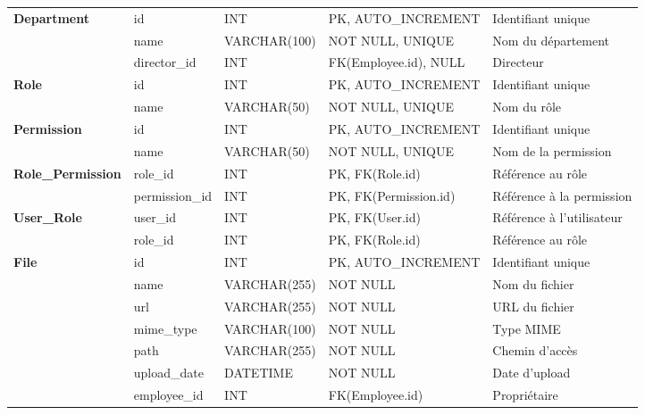 \begin{longtable}{|p{2.5cm}|p{3cm}|p{3cm}|p{3cm}|p{3cm}|}
    \multirow{3}{*}{\textbf{Department}} & id & INT & PK, AUTO\_INCREMENT & Identifiant unique \\
    \cline{2-5}
    & name & VARCHAR(100) & NOT NULL, UNIQUE & Nom du département \\
    \cline{2-5}
    & director\_id & INT & FK(Employee.id), NULL & Directeur \\
    \hline

    \multirow{2}{*}{\textbf{Role}} & id & INT & PK, AUTO\_INCREMENT & Identifiant unique \\
    \cline{2-5}
    & name & VARCHAR(50) & NOT NULL, UNIQUE & Nom du rôle \\
    \hline

    \multirow{2}{*}{\textbf{Permission}} & id & INT & PK, AUTO\_INCREMENT & Identifiant unique \\
    \cline{2-5}
    & name & VARCHAR(50) & NOT NULL, UNIQUE & Nom de la permission \\
    \hline

    \multirow{2}{*}{\textbf{Role\_Permission}} & role\_id & INT & PK, FK(Role.id) & Référence au rôle \\
    \cline{2-5}
    & permission\_id & INT & PK, FK(Permission.id) & Référence à la permission \\
    \hline

    \multirow{2}{*}{\textbf{User\_Role}} & user\_id & INT & PK, FK(User.id) & Référence à l'utilisateur \\
    \cline{2-5}
    & role\_id & INT & PK, FK(Role.id) & Référence au rôle \\
    \hline

    \multirow{6}{*}{\textbf{File}} & id & INT & PK, AUTO\_INCREMENT & Identifiant unique \\
    \cline{2-5}
    & name & VARCHAR(255) & NOT NULL & Nom du fichier \\
    \cline{2-5}
    & url & VARCHAR(255) & NOT NULL & URL du fichier \\
    \cline{2-5}
    & mime\_type & VARCHAR(100) & NOT NULL & Type MIME \\
    \cline{2-5}
    & path & VARCHAR(255) & NOT NULL & Chemin d'accès \\
    \cline{2-5}
    & upload\_date & DATETIME & NOT NULL & Date d'upload \\
    \cline{2-5}
    & employee\_id & INT & FK(Employee.id) & Propriétaire \\
    \hline


\end{longtable}
